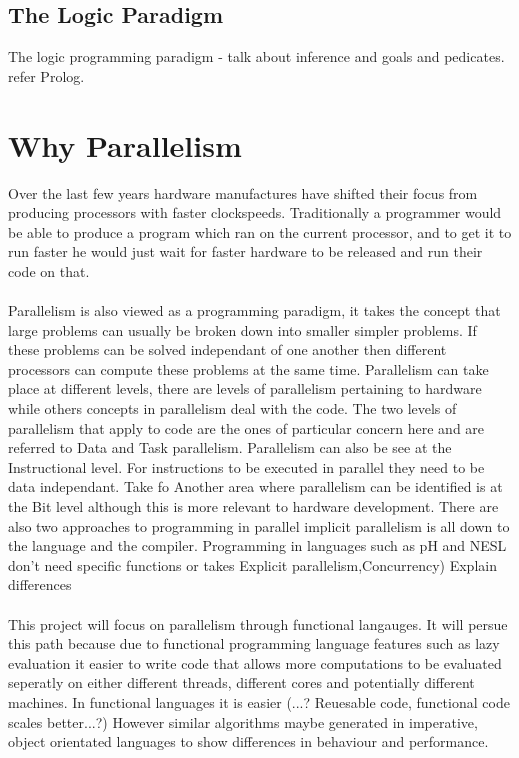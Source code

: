 \documentclass{report}
\begin{document}
\subsection{The Logic Paradigm}
The logic programming paradigm - talk about inference and goals and pedicates. refer Prolog.
\section{Why Parallelism}
Over the last few years hardware manufactures have shifted their focus from producing processors with faster clockspeeds. Traditionally a programmer would be able to produce a program which ran on the current processor, and to get it to run faster he would just wait for faster hardware to be released and run their code on that.  

\paragraph{}
Parallelism is also viewed as a programming paradigm, it takes the concept that large problems can usually be broken down into smaller simpler problems. If these problems can be solved independant of one another then different processors can compute these problems at the same time. Parallelism can take place at different levels, there are levels of parallelism pertaining to hardware while others concepts in parallelism deal with the code. The two levels of parallelism that apply to code are the ones of particular concern here and are referred to Data and Task parallelism. Parallelism can also be see at the Instructional level. For instructions to be executed in parallel they need to be data independant. Take fo  Another area where parallelism can be identified is at the Bit level although this is more relevant to hardware development. There are also two approaches to programming in parallel implicit parallelism is all down to the language and the compiler. Programming in languages such as pH and NESL don't need specific functions or  takes Explicit parallelism,Concurrency) Explain differences

\paragraph{}
This project will focus on parallelism through functional langauges. It will persue this path because due to functional programming language features such as lazy evaluation it easier to write code that allows more computations to be evaluated seperatly on either different threads, different cores and potentially different machines. In functional languages it is easier (...? Reuesable code, functional code scales better...?) However similar algorithms maybe generated in imperative, object orientated languages to show differences in behaviour and performance. 
\end{document}
